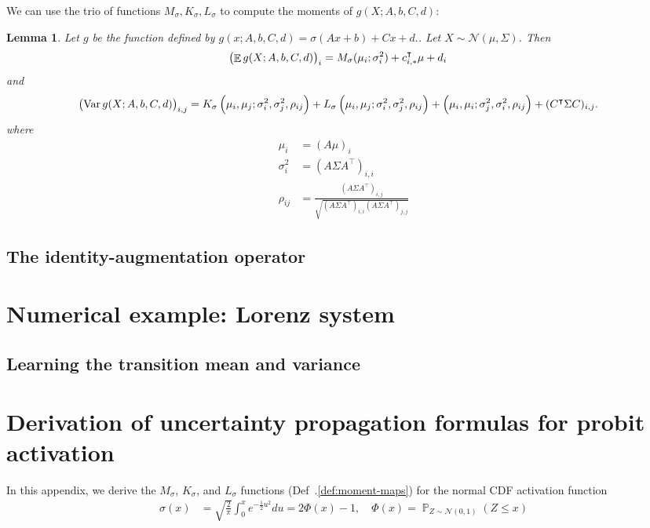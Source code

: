 \documentclass[oneside, article]{memoir}
\newtheorem{lemma}{Lemma}
\DeclareMathOperator{\expect}{\mathbb{E}}
\DeclareMathOperator{\probability}{\mathbb{P}}
\DeclareMathOperator{\Var}{\operatorname{Var}}
\begin{document}
We can use the trio of functions \(M_\sigma, K_\sigma, L_\sigma\) to
compute the moments of \(g(X; A, b, C, d)\):
\begin{lemma}
  Let \(g\) be the function defined by \(g(x; A, b, C, d) = \sigma(A
  x+ b) + C x + d.\).
  Let \(X \sim \mathcal N(\mu, \Sigma)\).
  Then
  \begin{align*}
    \del{\expect g(X; A, b, C, d)}_i &= M_\sigma(\mu_i; \sigma_i^2) +
    c_{i, *}^\intercal \mu + d_i
  \end{align*}
  and
  \begin{align*}
    \del{\Var g(X; A, b, C, d)}_{i, j}
    &= K_\sigma\del{
      \mu_i, \mu_j; \sigma_i^2, \sigma_j^2, \rho_{ij}
    }
    + L_\sigma\del{
      \mu_i, \mu_j; \sigma_i^2, \sigma_j^2, \rho_{ij}
    }
    + \del{
      \mu_i, \mu_i; \sigma_j^2, \sigma_i^2, \rho_{ij}
    }
    + (C^\intercal \Sigma C)_{i, j}.
  \end{align*}
  where
  \begin{align*}
    \mu_i &= (A\mu)_i
    \\
    \sigma_i^2 &= (A\Sigma A^\intercal)_{i,i}
    \\
    \rho_{ij} &= \frac{(A\Sigma A^\intercal)_{i,j}}{\sqrt{(A\Sigma
    A^\intercal)_{i,i} (A\Sigma A^\intercal)_{j,j}}}
  \end{align*}
\end{lemma}

\section{The identity-augmentation operator}

\chapter{Numerical example: Lorenz system}
\section{Learning the transition mean and variance}

\appendix
\chapter{Derivation of uncertainty propagation formulas for probit activation}
In this appendix, we derive the \(M_\sigma\), \(K_\sigma\), and
\(L_\sigma\) functions (Def~.\ref{def:moment-maps}) for the normal
CDF activation function
\begin{align}
  \sigma(x) &= \sqrt{\frac{2}{\pi}} \int_{0}^x e^{-\frac{1}{2} u^2}
  du = 2 \Phi(x) - 1, \quad \Phi(x) = \probability_{Z \sim \mathcal
  N(0, 1)}(Z \leq x)
  \label{eq:activation}
\end{align}
\end{document}
